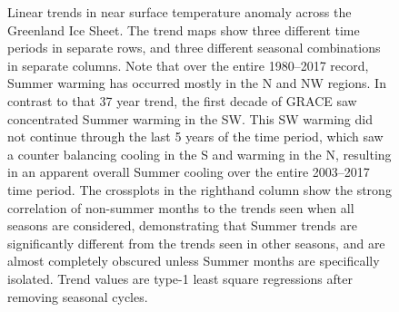 \documentclass[11pt]{report}
\begin{document}
 \begin{figure}[h]
\centering
{}
\caption[Spatial Variability of Temperature Anomaly Trends]{Linear trends in near surface temperature anomaly across the Greenland Ice Sheet. The trend maps show three different time periods in separate rows, and three different seasonal combinations in separate columns. Note that over the entire 1980--2017 record, Summer warming has occurred mostly in the N and NW regions. In contrast to that 37 year trend, the first decade of GRACE saw concentrated Summer warming in the SW. This SW warming did not continue through the last 5 years of the time period, which saw a counter balancing cooling in the S and warming in the N, resulting in an apparent overall Summer cooling over the entire 2003--2017 time period. The crossplots in the righthand column show the strong correlation of non-summer months to the trends seen when all seasons are considered, demonstrating that Summer trends are significantly different from the trends seen in other seasons, and are almost completely obscured unless Summer months are specifically isolated. Trend values are type-1 least square regressions after removing seasonal cycles.} \label{fig:tslopes}
\end{figure}
\end{document}
